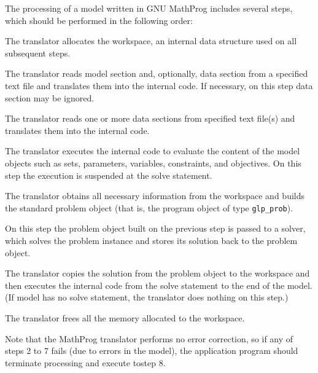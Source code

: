 The processing of a model written in GNU MathProg includes several
steps, which should be performed in the following order:


The translator allocates the workspace, an internal data structure used
on all subsequent steps.

 The translator reads model
section and, optionally, data section from a specified text file and
translates them into the internal code. If necessary, on this step data
section may be ignored.

 The translator reads one or
more data sections from specified text file(s) and translates them into
the internal code.

 The translator executes the
internal code to evaluate the content of the model objects such as sets,
parameters, variables, constraints, and objectives. On this step the
execution is suspended at the solve statement.

 The translator obtains all
necessary information from the workspace and builds the standard
problem object (that is, the program object of type \verb|glp_prob|).

 On this step the problem object
built on the previous step is passed to a solver, which solves the
problem instance and stores its solution back to the problem object.

 The translator copies the
solution from the problem object to the workspace and then executes the
internal code from the solve statement to the end of the model.
(If model has no solve statement, the translator does nothing on this
step.)

 The translator frees all the
memory allocated to the workspace.


Note that the MathProg translator performs no error correction, so if
any of steps 2 to 7 fails (due to errors in the model), the application
program should terminate processing and execute to\linebreak step 8.

